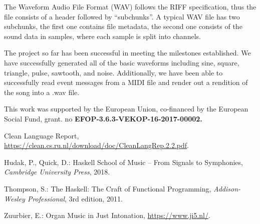 \documentclass[a0,portrait]{a0poster}
\begin{document}
\begin{sectbox}
The Waveform Audio File Format (WAV) follows the RIFF specification, thus the file consists of a header followed by ``subchunks''. A typical WAV file has two subchunks, the first one contains file metadata, the second one consists of the sound data in samples, where each sample is split into channels.

\begin{table}[H]
  \centering
  
\end{table}



The project so far has been successful in meeting the milestones established. We have successfully generated all of the basic waveforms including sine, square, triangle, pulse, sawtooth, and noise. Additionally, we have been able to successfully read event messages from a MIDI file and render out a rendition of the song into a .wav file. 

\vspace{1cm}

 This work was supported by the European Union, co-financed by the European Social Fund, grant. no \textbf{EFOP-3.6.3-VEKOP-16-2017-00002.}

\nocite{*}
%
\color{custom}
\begin{thebibliography}{199}\label{bibi}
\color{blackk}
 Clean Language Report, \url{https://clean.cs.ru.nl/download/doc/CleanLangRep.2.2.pdf}.

 Hudak, P., Quick, D.: Haskell School of Music -- From Signals to Symphonies,
\emph{Cambridge University Press}, 2018.

 Thompson, S.: The Haskell: The Craft of Functional Programming, 
\emph{ Addison-Wesley Professional}, 3rd edition, 2011.

 Zuurbier, E.: Organ Music in Just Intonation, \url{https://www.ji5.nl/}.
\end{thebibliography}



\end{sectbox}
\end{document}
